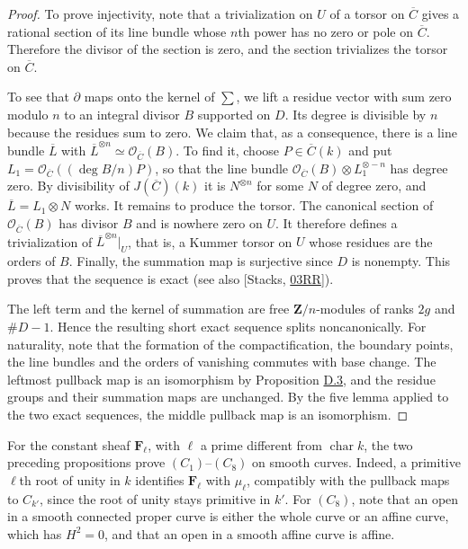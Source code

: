 \documentclass[11pt]{article}
\begin{document}
\begin{proof}[{Proof}]
To prove injectivity, note that a trivialization on \(U\) of a torsor on \(\overline C\) gives a rational section of its line bundle whose \(n\)th power has no zero or pole on \(\overline C\).  Therefore the divisor of the section is zero, and the section trivializes the torsor on \(\overline C\).

To see that \(\partial\) maps onto the kernel of \(\sum\), we lift a residue vector with sum zero modulo \(n\) to an integral divisor \(B\) supported on \(D\). Its degree is divisible by \(n\) because the residues sum to zero. We claim that, as a consequence, there is a line bundle \(\overline L\) with \(\overline L^{\otimes n}\simeq\mathcal O_{\overline C}(B)\). To find it, choose \(P\in\overline C(k)\) and put \(L_1=\mathcal O_{\overline C}((\deg B/n)P)\), so that the line bundle \(\mathcal O_{\overline C}(B)\otimes L_1^{\otimes-n}\) has degree zero. By divisibility of \(J(\overline C)(k)\) it is \(N^{\otimes n}\) for some \(N\) of degree zero, and \(\overline L=L_1\otimes N\) works. It remains to produce the torsor. The canonical section of \(\mathcal O_{\overline C}(B)\) has divisor \(B\) and is nowhere zero on \(U\). It therefore defines a trivialization of \(\overline L^{\otimes n}|_U\), that is, a Kummer torsor on \(U\) whose residues are the orders of \(B\). Finally, the summation map is surjective since \(D\) is nonempty. This proves that the sequence is exact (see also [Stacks, \href{https://stacks.math.columbia.edu/tag/03RR}{03RR}]).

The left term and the kernel of summation are free \(\mathbf Z/n\)-modules of ranks \(2g\) and \(\#D-1\). Hence the resulting short exact sequence splits noncanonically. For naturality, note that the formation of the compactification, the boundary points, the line bundles and the orders of vanishing commutes with base change. The leftmost pullback map is an isomorphism by Proposition \hyperref[bp181]{D.3}, and the residue groups and their summation maps are unchanged. By the five lemma applied to the two exact sequences, the middle pullback map is an isomorphism.
\end{proof}

\label{bp188}%
For the constant sheaf \(\mathbf F_\ell\), with \(\ell\) a prime different from \(\operatorname{char}k\), the two preceding propositions prove \((C_1)\)–\((C_8)\) on smooth curves. Indeed, a primitive \(\ell\)th root of unity in \(k\) identifies \(\mathbf F_\ell\) with \(\mu_\ell\), compatibly with the pullback maps to \(C_{k'}\), since the root of unity stays primitive in \(k'\). For \((C_8)\), note that an open in a smooth connected proper curve is either the whole curve or an affine curve, which has \(H^2=0\), and that an open in a smooth affine curve is affine.
\end{document}
